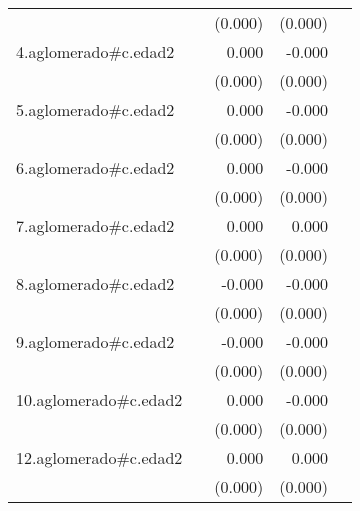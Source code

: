 {\begin{longtable}{l*{4}{D{.}{.}{-1}}}
            &                     &     (0.000)         &     (0.000)         &                     \\
\addlinespace
4.aglomerado#c.edad2&                     &       0.000         &      -0.000\sym{*}  &                     \\
            &                     &     (0.000)         &     (0.000)         &                     \\
\addlinespace
5.aglomerado#c.edad2&                     &       0.000         &      -0.000         &                     \\
            &                     &     (0.000)         &     (0.000)         &                     \\
\addlinespace
6.aglomerado#c.edad2&                     &       0.000         &      -0.000         &                     \\
            &                     &     (0.000)         &     (0.000)         &                     \\
\addlinespace
7.aglomerado#c.edad2&                     &       0.000\sym{*}  &       0.000         &                     \\
            &                     &     (0.000)         &     (0.000)         &                     \\
\addlinespace
8.aglomerado#c.edad2&                     &      -0.000         &      -0.000         &                     \\
            &                     &     (0.000)         &     (0.000)         &                     \\
\addlinespace
9.aglomerado#c.edad2&                     &      -0.000         &      -0.000         &                     \\
            &                     &     (0.000)         &     (0.000)         &                     \\
\addlinespace
10.aglomerado#c.edad2&                     &       0.000         &      -0.000         &                     \\
            &                     &     (0.000)         &     (0.000)         &                     \\
\addlinespace
12.aglomerado#c.edad2&                     &       0.000         &       0.000         &                     \\
            &                     &     (0.000)         &     (0.000)         &                     \\

\end{longtable}}
